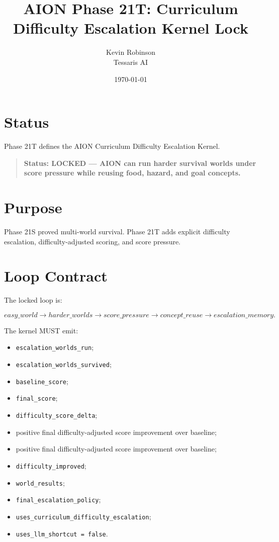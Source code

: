 \documentclass[11pt,a4paper]{article}
\title{\textbf{AION Phase 21T: Curriculum Difficulty Escalation Kernel Lock}}
\author{Kevin Robinson\\Tessaris AI}
\date{\today}
\begin{document}
\maketitle

\section{Status}

Phase 21T defines the AION Curriculum Difficulty Escalation Kernel.

\begin{quote}
\textbf{Status: LOCKED --- AION can run harder survival worlds under score pressure while reusing food, hazard, and goal concepts.}
\end{quote}

\section{Purpose}

Phase 21S proved multi-world survival. Phase 21T adds explicit difficulty escalation, difficulty-adjusted scoring, and score pressure.

\section{Loop Contract}

The locked loop is:

\[
easy\_world \rightarrow harder\_worlds
\rightarrow score\_pressure \rightarrow concept\_reuse
\rightarrow escalation\_memory.
\]

The kernel MUST emit:

\begin{itemize}
  \item \texttt{escalation\_worlds\_run};
  \item \texttt{escalation\_worlds\_survived};
  \item \texttt{baseline\_score};
  \item \texttt{final\_score};
  \item \texttt{difficulty\_score\_delta};
  \item positive final difficulty-adjusted score improvement over baseline;
  \item positive final difficulty-adjusted score improvement over baseline;
  \item \texttt{difficulty\_improved};
  \item \texttt{world\_results};
  \item \texttt{final\_escalation\_policy};
  \item \texttt{uses\_curriculum\_difficulty\_escalation};
  \item \texttt{uses\_llm\_shortcut = false}.
\end{itemize}
\end{document}
